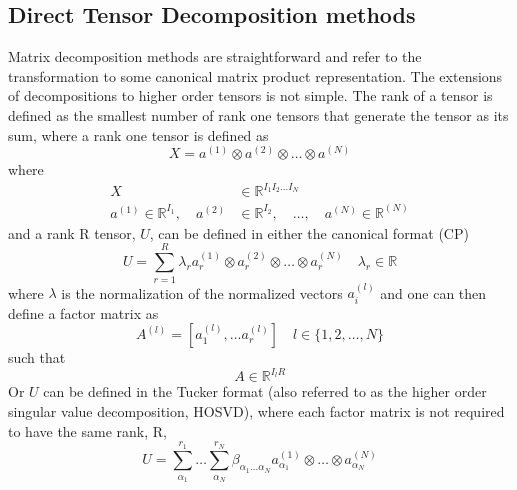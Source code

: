 	\subsection{Direct Tensor Decomposition methods}
		Matrix decomposition methods are straightforward and refer to the transformation to some canonical matrix product representation. 
		The extensions of decompositions to higher order tensors is not simple. The rank of a tensor is defined as the smallest number of rank one tensors that generate the tensor as its sum, where a rank one tensor is defined as
			\begin{equation}
				\mathit{X} = a^{(1)} \otimes a^{(2)} \otimes \dots \otimes a^{(N)}
			\end{equation}
		where
			\begin{equation}
				\begin{aligned}
					\mathit{X} &\in \mathbb{R}^{I_1I_2\dots I_N} \\
					a^{(1)} \in \mathbb{R}^{I_1}, \quad a^{(2)} &\in \mathbb{R}^{I_2}, \quad \dots, \quad a^{(N)} \in \mathbb{R}^{(N)}
				\end{aligned}
			\end{equation}
		and a rank R tensor, $\mathit{U}$, can be defined in either the canonical format (CP)
			\begin{equation}
				\mathit{U} = \sum_{r=1}^R \lambda_r a^{(1)}_r \otimes a^{(2)}_r \otimes \dots \otimes a^{(N)}_r \quad \lambda_r \in \mathbb{R}
			\end{equation}
		where $\lambda$ is the normalization of the normalized vectors $a^{(l)}_i$ and one can then define a factor matrix as 
			\begin{equation}
				A^{(l)} = [a^{(l)}_1,\dots a^{(l)}_r]\quad l\in\{1,2,\dots,N\}
			\end{equation}
		such that 
			\begin{equation}
				A \in \mathbb{R}^{I_l R}
			\end{equation}
	 	Or $\mathit{U}$ can be defined in the Tucker format (also referred to as the higher order singular value decomposition, HOSVD), where each factor matrix is not required to have the same rank, R,
			\begin{equation}
				\mathit{U} = \sum_{\alpha_1}^{r_1} \dots \sum_{\alpha_N}^{r_N} \beta_{\alpha_1\dots\alpha_N}a_{\alpha_1}^{(1)}\otimes \dots \otimes a_{\alpha_N}^{(N)}
			\end{equation}
